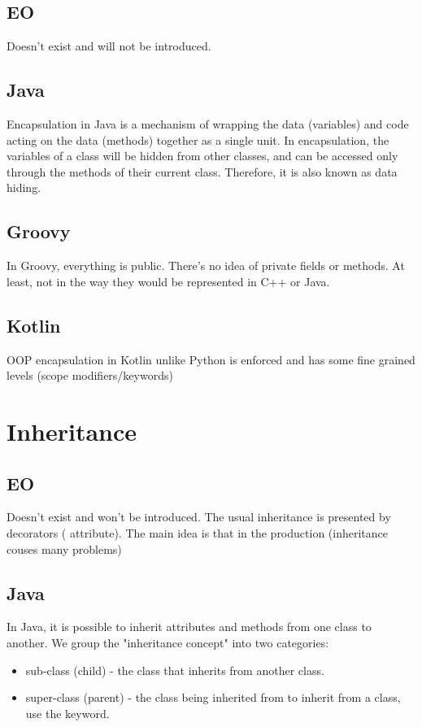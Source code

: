 \documentclass[12pt]{book}
\begin{document}
{{\subsection{EO}
Doesn't exist and will not be introduced.

\subsection{Java}
Encapsulation in Java is a mechanism of wrapping  the data (variables) and code acting on the  data (methods) together as a single unit. In encapsulation, the variables of a class will be hidden from other classes, and can be accessed only through the methods of their current class.  Therefore, it is also known as data hiding.

\subsection{Groovy}
In Groovy, everything is public. There’s no idea  of private fields or methods. At least, not in the way they would be represented in C++ or Java.

\subsection{Kotlin}
OOP encapsulation in Kotlin unlike Python is enforced and has some fine grained levels (scope modifiers/keywords)

\section{Inheritance}

\subsection{EO}
Doesn't exist and won't be introduced. The usual inheritance is presented by decorators ( attribute). The main idea is that in the production (inheritance couses  many problems)

\subsection{Java}
In Java, it is possible to inherit attributes and methods from one class to another. We group the "inheritance concept" into two categories: 
\begin{itemize}
    \item sub-class (child) - the class that inherits from another class.
    \item super-class (parent) - the class being  inherited from to inherit from a class, use the  keyword.
\end{itemize}

}}
\end{document}
